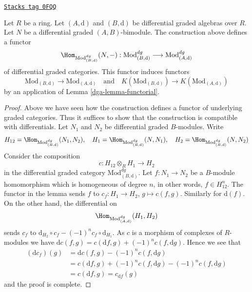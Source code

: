 \begin{lemma}[Hom]
\label{dga-lemma-hom}
\href{https://stacks.math.columbia.edu/tag/0FQQ}{\texttt{Stacks tag 0FQQ}}

Let $R$ be a ring. Let $(A, \text{d})$ and $(B, \text{d})$
be differential graded algebras over $R$. Let $N$ be a
differential graded $(A, B)$-bimodule. The construction above
defines a functor
$$
\Hom_{\text{Mod}^{dg}_{(B, \text{d})}}(N, -) :
\text{Mod}^{dg}_{(B, \text{d})}
\longrightarrow
\text{Mod}^{dg}_{(A, \text{d})}
$$
of differential graded categories. This functor induces functors
$$
\text{Mod}_{(B, \text{d})} \to \text{Mod}_{(A, \text{d})}
\quad\text{and}\quad
K(\text{Mod}_{(B, \text{d})}) \to K(\text{Mod}_{(A, \text{d})})
$$
by an application of Lemma \ref{dga-lemma-functorial}.
\end{lemma}

\begin{proof}
Above we have seen how the construction defines a functor of underlying
graded categories. Thus it suffices to show that the construction is
compatible with differentials. Let $N_1$ and $N_2$ be differential
graded $B$-modules. Write
$$
H_{12} = \Hom_{\text{Mod}^{dg}_{(B, \text{d})}}(N_1, N_2),\quad
H_1 = \Hom_{\text{Mod}^{dg}_{(B, \text{d})}}(N, N_1),\quad
H_2 = \Hom_{\text{Mod}^{dg}_{(B, \text{d})}}(N, N_2)
$$
Consider the composition
$$
c : H_{12} \otimes_R H_1 \longrightarrow H_2
$$
in the differential graded category $\text{Mod}^{dg}_{(B, \text{d})}$.
Let $f : N_1 \to N_2$ be a $B$-module homomorphism which is homogeneous
of degree $n$, in other words, $f \in H_{12}^n$.
The functor in the lemma sends $f$ to $c_f : H_1 \to H_2$, $g \mapsto c(f, g)$.
Similarly for $\text{d}(f)$. On the other hand, the differential on
$$
\Hom_{\text{Mod}^{dg}_{(A, \text{d})}}(H_1, H_2)
$$
sends $c_f$ to $\text{d}_{H_2} \circ c_f - (-1)^n c_f \circ \text{d}_{H_1}$.
As $c$ is a morphism of complexes of $R$-modules we have
$\text{d} c(f, g) = c(\text{d}f, g) + (-1)^n c(f, \text{d}g)$.
Hence we see that
\begin{align*}
(\text{d}c_f)(g)
& =
\text{d}c(f,g) - (-1)^n c(f, \text{d}g) \\
& =
c(\text{d}f, g) + (-1)^n c(f, \text{d}g)  - (-1)^n c(f, \text{d}g) \\
& =
c(\text{d}f, g) = c_{\text{d}f}(g)
\end{align*}
and the proof is complete.
\end{proof}

